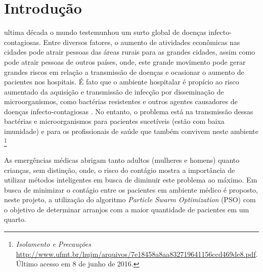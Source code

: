 \documentclass[journal]{IEEEtran}
\begin{document}
%
\IEEEpeerreviewmaketitle



\section{Introdução}
% 
% 
% 
% 
 ultima década o mundo testemunhou um surto global de doenças infecto-contagiosas. Entre diversos fatores, o aumento de atividades econômicas nas cidades pode atrair pessoas das áreas rurais para as grandes cidades, assim como pode atrair pessoas de outros países, onde, este grande movimento pode gerar grandes riscos em relação a transmissão de doenças \cite{Inayatulloh:2015} e ocasionar o aumento de pacientes nos hospitais. É fato que o ambiente hospitalar é propício ao risco aumentado da aquisição e transmissão de infecção por disseminação de microorganismos, como bactérias resistentes e outros agentes causadores de doenças infecto-contagiosas \cite{Ribeiro:2008}. No entanto, o problema está na transmissão dessas bactérias e microorganismos para pacientes sucetíveis (estão com baixa imunidade) e para os profissionais de saúde que também convivem neste ambiente \footnote[1]{\emph{Isolamento e Precauções} \url{http://www.ufmt.br/hujm/arquivos/7e18458a8aa832719641156ccd469de8.pdf}. Último acesso em 8 de junho de 2016.}\par%
As emergências médicas abrigam tanto adultos (mulheres e homens) quanto crianças, sem distinção, onde, o risco do contágio mostra a importância de utilizar métodos inteligentes em busca de diminuir este problema ao máximo. Em busca de minimizar o contágio entre os pacientes em ambiente médico é proposto, neste projeto, a utilização do algoritmo \textit{Particle Swarm Optimization} (PSO) com o objetivo de determinar arranjos com a maior quantidade de pacientes em um quarto.\par%
\end{document}
